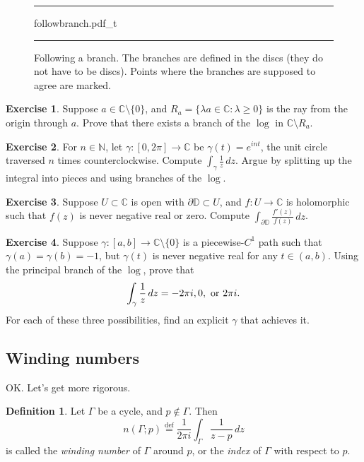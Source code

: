 \documentclass[12pt,openany]{book}
\newcommand{\glsadd}[2][]{}
\newcommand{\avoidbreak}{\postdisplaypenalty=100}
\newcommand{\C}{{\mathbb{C}}}
\newcommand{\N}{{\mathbb{N}}}
\newcommand{\D}{{\mathbb{D}}}
\newcommand{\myindex}[1]{#1\index{#1}}
\theoremstyle{plain}
\theoremstyle{remark}
\theoremstyle{definition}
\newtheorem{defn}[thm]{Definition}
\newenvironment{exbox}{%
    \def\FrameCommand{\vrule width 1pt \relax\hspace{10pt}}%
    \MakeFramed{\advance\hsize-\width\FrameRestore}%
}{%
    \endMakeFramed
}
\newenvironment{myfig}{%
\begin{figure}[h!t]
\noindent\rule{\textwidth}{0.5pt}\vspace{12pt}\par\centering}%
{\par\noindent\rule{\textwidth}{0.5pt}
\end{figure}}
\theoremstyle{exercise}
\newtheorem{exercise}{Exercise}[section]
\theoremstyle{example}
\begin{document}
\begin{myfig}
{followbranch.pdf_t}
\caption{Following a branch.
The branches are defined in the discs
(they do not have to be discs).
Points where the branches are supposed to agree
are marked.\label{fig:followbranch}}
\end{myfig}

\begin{exbox}
\begin{exercise}
Suppose $a \in \C \setminus \{ 0 \}$, and
$R_a = \{ \lambda a \in \C : \lambda \geq 0 \}$
is the ray from the origin through $a$.  Prove
that there exists a branch of the $\log$ in $\C \setminus R_a$.
\end{exercise}

\begin{exercise}
For $n \in \N$, let $\gamma \colon [0,2\pi] \to \C$ be $\gamma(t) = e^{int}$,
the unit circle traversed $n$ times counterclockwise.  Compute
$\int_\gamma \frac{1}{z} \, dz$.  Argue by splitting up the integral
into pieces and using branches of the $\log$.
\end{exercise}

\begin{exercise}
Suppose
$U \subset \C$ is open with
$\partial \D \subset U$,
and
$f \colon U \to \C$ is holomorphic
such that
$f(z)$ is never negative real or zero.
Compute
$\int_{\partial \D} \frac{f'(z)}{f(z)} \, dz$.
\end{exercise}

\begin{exercise}
Suppose $\gamma \colon [a,b] \to \C \setminus \{ 0 \}$ is a piecewise-$C^1$
path such that $\gamma(a) = \gamma(b) = -1$, but $\gamma(t)$ is never
negative real for any $t \in (a,b)$.  Using the principal branch of the
$\log$, prove that
\begin{equation*}
\int_\gamma \frac{1}{z} \, dz = -2\pi i, 0, \text{ or } 2\pi i.
\avoidbreak
\end{equation*}
For each of these three possibilities,
find an explicit $\gamma$ that achieves it.
\end{exercise}
\end{exbox}

\subsection{Winding numbers}

OK\@.  Let's get more rigorous.

\begin{defn}\label{defn:windingnumber}
Let $\Gamma$ be
a cycle,
and $p \notin \Gamma$.  Then
\glsadd{not:windnum}%
\begin{equation*}
n(\Gamma;p)
\overset{\text{def}}{=}
\frac{1}{2\pi i} \int_\Gamma \frac{1}{z-p} \, dz
\end{equation*}
is called the
\emph{\myindex{winding number}} of $\Gamma$ around $p$, or
the 
\emph{\myindex{index}} of $\Gamma$ with respect to $p$.
\end{defn}
\end{document}

